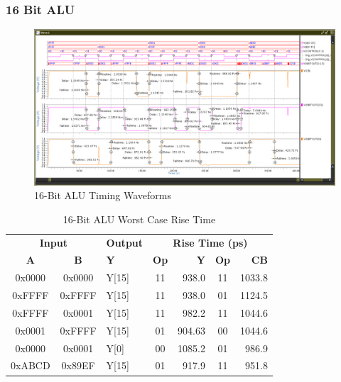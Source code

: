 \documentclass[11pt]{article}
\begin{document}
		\subsubsection{16 Bit ALU}
		
			\begin{figure}[H]
				\centering
				\includegraphics[width=1\linewidth]{"Pictures/ALU 16-Bit Full Timing"}
				\caption{16-Bit ALU Timing Waveforms}
				\label{fig:alu-16-bit-full-timing}
			\end{figure}
			
		
			\begin{table}[H]
				\centering
				\caption{16-Bit ALU Worst Case Rise Time}
				\label{tab:ALU-16-Bit-Risetime}
				\begin{tabular}{|cclcrcr|}
					\hline
					\multicolumn{2}{|c}{\textbf{Input}} & \textbf{Output} & \multicolumn{4}{c|}{\textbf{Rise Time (ps)}} \\
					\textbf{A} & \textbf{B} & \textbf{Y} & \textbf{Op} & \textbf{Y} & \textbf{Op} & \textbf{CB} \\
					\hline
					0x0000 & 0x0000 & Y{[}15{]} & 11 & 938.0 & 11 & 1033.8 \\
					0xFFFF & 0xFFFF & Y{[}15{]} & 11 & 938.0 & 01 & 1124.5 \\
					0xFFFF & 0x0001 & Y{[}15{]} & 11 & 982.2 & 11 & 1044.6 \\
					0x0001 & 0xFFFF & Y{[}15{]} & 01 & 904.63 & 00 & 1044.6 \\
					0x0000 & 0x0001 & Y{[}0{]} & 00 & 1085.2 & 01 & 986.9 \\
					0xABCD & 0x89EF & Y{[}15{]} & 01 & 917.9 & 11 & 951.8 \\
					\hline
				\end{tabular}
			\end{table}
		
\end{document}
